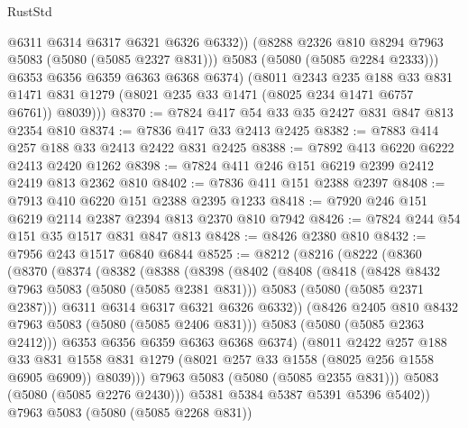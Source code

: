 \begin{lexlean}{RustStd}
\begin{coremodule}
{\begin{coremodule}
{{{{{                @6311
                @6314
                @6317
                @6321
                @6326
                @6332))
            (@8288 @2326 @810 @8294 @7963 @5083 (@5080 (@5085 @2327 @831)))
            @5083
            (@5080 (@5085 @2284 @2333)))
          @6353
          @6356
          @6359
          @6363
          @6368
          @6374)
        (@8011
          @2343
          @235
          @188
          @33
          @831
          @1471
          @831
          @1279
          (@8021 @235 @33 @1471 (@8025 @234 @1471 @6757 @6761))
          @8039)))
@8370 := @7824 @417 @54 @33 @35 @2427 @831 @847 @813 @2354 @810
@8374 := @7836 @417 @33 @2413 @2425
@8382 := @7883 @414 @257 @188 @33 @2413 @2422 @831 @2425
@8388 := @7892 @413 @6220 @6222 @2413 @2420 @1262
@8398 := @7824 @411 @246 @151 @6219 @2399 @2412 @2419 @813 @2362 @810
@8402 := @7836 @411 @151 @2388 @2397
@8408 := @7913 @410 @6220 @151 @2388 @2395 @1233
@8418 := @7920 @246 @151 @6219 @2114 @2387 @2394 @813 @2370 @810 @7942
@8426 := @7824 @244 @54 @151 @35 @1517 @831 @847 @813
@8428 := @8426 @2380 @810
@8432 := @7956 @243 @1517 @6840 @6844
@8525 := @8212
    (@8216
      (@8222
        (@8360
          (@8370
            (@8374
              (@8382
                (@8388
                  (@8398
                    (@8402
                      (@8408
                        (@8418
                          (@8428 @8432 @7963 @5083 (@5080 (@5085 @2381 @831)))
                          @5083
                          (@5080 (@5085 @2371 @2387)))
                        @6311
                        @6314
                        @6317
                        @6321
                        @6326
                        @6332))
                    (@8426 @2405 @810 @8432 @7963 @5083 (@5080 (@5085 @2406 @831)))
                    @5083
                    (@5080 (@5085 @2363 @2412)))
                  @6353
                  @6356
                  @6359
                  @6363
                  @6368
                  @6374)
                (@8011
                  @2422
                  @257
                  @188
                  @33
                  @831
                  @1558
                  @831
                  @1279
                  (@8021 @257 @33 @1558 (@8025 @256 @1558 @6905 @6909))
                  @8039)))
            @7963
            @5083
            (@5080 (@5085 @2355 @831)))
          @5083
          (@5080 (@5085 @2276 @2430)))
        @5381
        @5384
        @5387
        @5391
        @5396
        @5402))
    @7963
    @5083
    (@5080 (@5085 @2268 @831))
}}}}}
\end{coremodule}}
\end{coremodule}
\end{lexlean}
